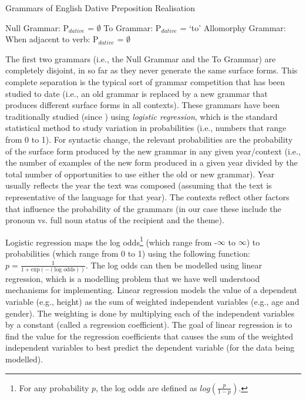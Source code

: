 	\begin{exe}
		\ex Grammars of English Dative Preposition Realisation
		\begin{xlist}
			\ex Null Grammar: P$_{dative}$ = $\emptyset$ \label{ex:allnull}
			\ex To Grammar: P$_{dative}$ = `to' \label{ex:allto}
			\ex Allomorphy Grammar: When adjacent to verb: P$_{dative}$ = $\emptyset$\label{ex:allomorphgram}
		\end{xlist}
	\end{exe}

	The first two grammars (i.e., the Null Grammar and the To Grammar) are completely disjoint, in so far as they never generate the same surface forms. This complete separation is the typical sort of grammar competition that has been studied to date (i.e., an old grammar is replaced by a new grammar that produces different surface forms in all contexts). These grammars have been traditionally studied (since \citealt{Kroch.1989}) using \textit{logistic regression}, which is the standard statistical method to study variation in probabilities (i.e., numbers that range from 0 to 1). For syntactic change, the relevant probabilities are the probability of the surface form produced by the new grammar in any given year/context (i.e., the number of examples of the new form produced in a given year divided by the total number of opportunities to use either the old or new grammar). Year usually reflects the year the text was composed (assuming that the text is representative of the language for that year). The contexts reflect other factors that influence the probability of the grammars (in our case these include the pronoun vs. full noun status of the recipient and the theme).

	Logistic regression maps the log odds\footnote{For any probability $p$, the log odds are defined as $log(\frac{p}{1-p})$.} (which range from -$\infty$ to $\infty$) to probabilities (which range from 0 to 1) using the following function: $p=\frac{1}{1+\text{exp}(-(\text{log odds}))}$. The log odds can then be modelled using linear regression, which is a modelling problem that we have well understood mechanisms for implementing. Linear regression models the value of a dependent variable (e.g., height) as the sum of weighted independent variables (e.g., age and gender). The weighting is done by multiplying each of the independent variables by a constant (called a regression coefficient). The goal of linear regression is to find the value for the regression coefficients that causes the sum of the weighted independent variables to best predict the dependent variable (for the data being modelled).

